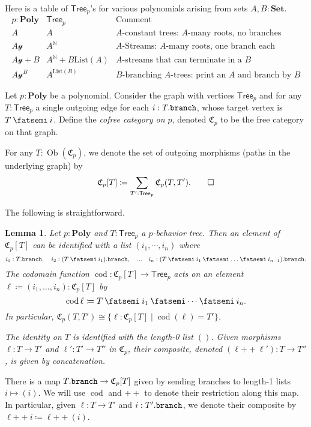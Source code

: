 \documentclass[11pt, one side, article]{memoir}
\theoremstyle{definition}
\theoremstyle{plain}
\newtheorem{lemma}[definitionx]{Lemma}
\newenvironment{example}
  {\pushQED{\qed}\renewcommand{\qedsymbol}{$\lozenge$}\examplex}
  {\popQED\endexamplex}
\newenvironment{definition}
  {\pushQED{\qed}\renewcommand{\qedsymbol}{$\lozenge$}\definitionx}
  {\popQED\enddefinitionx}
\DeclareMathOperator{\cod}{cod}
\DeclareMathOperator{\ob}{Ob}
\newcommand{\Set}[1]{\mathsf{#1}}%
\newcommand{\Cat}[1]{\mathbf{#1}}%
\newcommand{\Fun}[1]{\mathrm{#1}}%
\newcommand{\then}{\mathbin{\fatsemi}}
\newcommand{\tn}[1]{\textnormal{#1}}
\newcommand{\nn}{\mathbb{N}}
\newcommand{\smset}{\Cat{Set}}
\newcommand{\List}{\Fun{List}}
\newcommand{\plpl}{\mathbin{+\!\!+}}
\newcommand{\yon}{\mathcal{y}}
\newcommand{\poly}{\Cat{Poly}}
\newcommand{\Cofree}{\mathfrak{C}}
\newcommand{\tree}{\Set{Tree}}
\newcommand{\br}{\tn{\texttt{branch}}}
\begin{document}
\begin{example}
Here is a table of $\tree_p$'s for various polynomials arising from sets $A,B:\smset$.
\[
\begin{array}{l|l|l}
p:\poly&\tree_p&\text{Comment}\\\hline
A&A&\text{$A$-constant trees: $A$-many roots, no branches}\\
A\yon&A^\nn&\text{$A$-Streams: $A$-many roots, one branch each}\\
A\yon+B&A^\nn+B\List(A)&\text{$A$-streams that can terminate in a $B$}\\
A\yon^B&A^{\List(B)}&\text{$B$-branching $A$-trees: print an $A$ and branch by $B$}
\end{array}
\]
\end{example}

\begin{definition}[Cofree category $\Cofree_p$]
Let $p:\poly$ be a polynomial. Consider the graph with vertices $\tree_p$ and for any $T:\tree_p$ a single outgoing edge for each $i:T.\br$, whose target vertex is $T\then i$. Define the \emph{cofree category on $p$}, denoted $\Cofree_p$ to be the free category on that graph.

For any $T:\ob(\Cofree_p)$, we denote the set of outgoing morphisms (paths in the underlying graph) by
\[
\Cofree_p[T]\coloneqq\sum_{T':\tree_p}\Cofree_p(T,T').
\qedhere
\]
\end{definition}

The following is straightforward.
\begin{lemma}
Let $p:\poly$ and $T:\tree_p$ a $p$-behavior tree. Then an element of $\Cofree_p[T]$ can be identified with a list $(i_1,\cdots,i_n)$ where
\[
i_1:T.\br,\quad
i_2:(T\then i_1).\br,\quad...\quad
i_n:(T\then i_1\then\ldots\then i_{n-1}).\br.
\]
The codomain function $\cod\colon\Cofree_p[T]\to\tree_p$ acts on an element $\ell\coloneqq(i_1,\ldots,i_n):\Cofree_p[T]$ by 
\[
\cod\ell\coloneqq T\then i_1\then\cdots\then i_n.
\]
In particular, $\Cofree_p(T,T')\cong\{\ell\colon\Cofree_p[T]\mid\cod(\ell)=T'\}$. 

The identity on $T$ is identified with the length-0 list $()$. Given morphisms $\ell\colon T\to T'$ and $\ell'\colon T'\to T''$ in $\Cofree_p$, their composite, denoted $(\ell\plpl\ell')\colon T\to T''$, is given by concatenation.
\end{lemma}

There is a map $T.\br\to\Cofree_p[T]$ given by sending branches to length-1 lists $i\mapsto (i)$. We will use $\cod$ and $\plpl$ to denote their restriction along this map. In particular, given $\ell\colon T\to T'$ and $i:T'.\br$, we denote their composite by $\ell\plpl i\coloneqq\ell\plpl(i)$.
\end{document}
